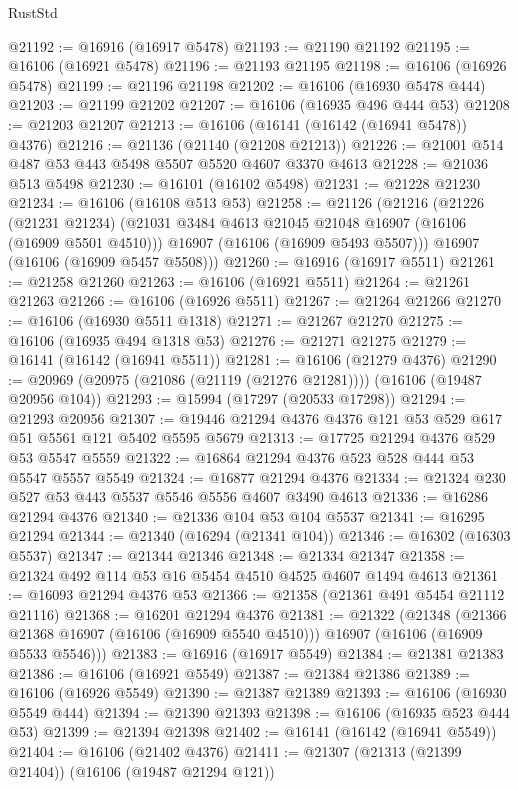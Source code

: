 \begin{lexlean}{RustStd}
\begin{coremodule}
@21192 := @16916 (@16917 @5478)
@21193 := @21190 @21192
@21195 := @16106 (@16921 @5478)
@21196 := @21193 @21195
@21198 := @16106 (@16926 @5478)
@21199 := @21196 @21198
@21202 := @16106 (@16930 @5478 @444)
@21203 := @21199 @21202
@21207 := @16106 (@16935 @496 @444 @53)
@21208 := @21203 @21207
@21213 := @16106 (@16141 (@16142 (@16941 @5478)) @4376)
@21216 := @21136 (@21140 (@21208 @21213))
@21226 := @21001 @514 @487 @53 @443 @5498 @5507 @5520 @4607 @3370 @4613
@21228 := @21036 @513 @5498
@21230 := @16101 (@16102 @5498)
@21231 := @21228 @21230
@21234 := @16106 (@16108 @513 @53)
@21258 := @21126
    (@21216
      (@21226
        (@21231 @21234)
        (@21031 @3484 @4613 @21045 @21048 @16907 (@16106 (@16909 @5501 @4510)))
        @16907
        (@16106 (@16909 @5493 @5507)))
      @16907
      (@16106 (@16909 @5457 @5508)))
@21260 := @16916 (@16917 @5511)
@21261 := @21258 @21260
@21263 := @16106 (@16921 @5511)
@21264 := @21261 @21263
@21266 := @16106 (@16926 @5511)
@21267 := @21264 @21266
@21270 := @16106 (@16930 @5511 @1318)
@21271 := @21267 @21270
@21275 := @16106 (@16935 @494 @1318 @53)
@21276 := @21271 @21275
@21279 := @16141 (@16142 (@16941 @5511))
@21281 := @16106 (@21279 @4376)
@21290 := @20969 (@20975 (@21086 (@21119 (@21276 @21281)))) (@16106 (@19487 @20956 @104))
@21293 := @15994 (@17297 (@20533 @17298))
@21294 := @21293 @20956
@21307 := @19446 @21294 @4376 @4376 @121 @53 @529 @617 @51 @5561 @121 @5402 @5595 @5679
@21313 := @17725 @21294 @4376 @529 @53 @5547 @5559
@21322 := @16864 @21294 @4376 @523 @528 @444 @53 @5547 @5557 @5549
@21324 := @16877 @21294 @4376
@21334 := @21324 @230 @527 @53 @443 @5537 @5546 @5556 @4607 @3490 @4613
@21336 := @16286 @21294 @4376
@21340 := @21336 @104 @53 @104 @5537
@21341 := @16295 @21294
@21344 := @21340 (@16294 (@21341 @104))
@21346 := @16302 (@16303 @5537)
@21347 := @21344 @21346
@21348 := @21334 @21347
@21358 := @21324 @492 @114 @53 @16 @5454 @4510 @4525 @4607 @1494 @4613
@21361 := @16093 @21294 @4376 @53
@21366 := @21358 (@21361 @491 @5454 @21112 @21116)
@21368 := @16201 @21294 @4376
@21381 := @21322
    (@21348
      (@21366 @21368 @16907 (@16106 (@16909 @5540 @4510)))
      @16907
      (@16106 (@16909 @5533 @5546)))
@21383 := @16916 (@16917 @5549)
@21384 := @21381 @21383
@21386 := @16106 (@16921 @5549)
@21387 := @21384 @21386
@21389 := @16106 (@16926 @5549)
@21390 := @21387 @21389
@21393 := @16106 (@16930 @5549 @444)
@21394 := @21390 @21393
@21398 := @16106 (@16935 @523 @444 @53)
@21399 := @21394 @21398
@21402 := @16141 (@16142 (@16941 @5549))
@21404 := @16106 (@21402 @4376)
@21411 := @21307 (@21313 (@21399 @21404)) (@16106 (@19487 @21294 @121))

\end{coremodule}
\end{lexlean}
